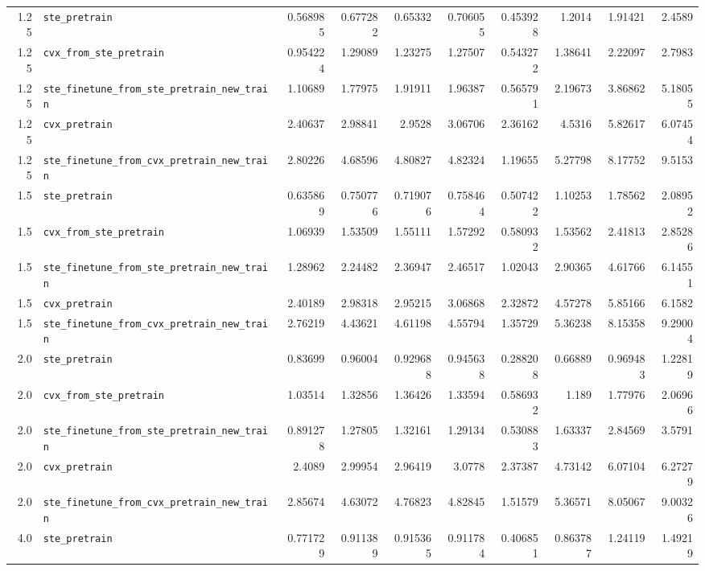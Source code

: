 \begin{longtable}{@{}r l *{8}{r}@{}}
1.25 & \texttt{ste\_pretrain} & 0.568985 & 0.677282 & 0.65332 & 0.706055 & 0.453928 & 1.2014 & 1.91421 & 2.4589 \\
1.25 & \texttt{cvx\_from\_ste\_pretrain} & 0.954224 & 1.29089 & 1.23275 & 1.27507 & 0.543272 & 1.38641 & 2.22097 & 2.7983 \\
1.25 & \texttt{ste\_finetune\_from\_ste\_pretrain\_new\_train} & 1.10689 & 1.77975 & 1.91911 & 1.96387 & 0.565791 & 2.19673 & 3.86862 & 5.18055 \\
1.25 & \texttt{cvx\_pretrain} & 2.40637 & 2.98841 & 2.9528 & 3.06706 & 2.36162 & 4.5316 & 5.82617 & 6.07454 \\
1.25 & \texttt{ste\_finetune\_from\_cvx\_pretrain\_new\_train} & 2.80226 & 4.68596 & 4.80827 & 4.82324 & 1.19655 & 5.27798 & 8.17752 & 9.5153 \\
1.5 & \texttt{ste\_pretrain} & 0.635869 & 0.750776 & 0.719076 & 0.758464 & 0.507422 & 1.10253 & 1.78562 & 2.08952 \\
1.5 & \texttt{cvx\_from\_ste\_pretrain} & 1.06939 & 1.53509 & 1.55111 & 1.57292 & 0.580932 & 1.53562 & 2.41813 & 2.85286 \\
1.5 & \texttt{ste\_finetune\_from\_ste\_pretrain\_new\_train} & 1.28962 & 2.24482 & 2.36947 & 2.46517 & 1.02043 & 2.90365 & 4.61766 & 6.14551 \\
1.5 & \texttt{cvx\_pretrain} & 2.40189 & 2.98318 & 2.95215 & 3.06868 & 2.32872 & 4.57278 & 5.85166 & 6.1582 \\
1.5 & \texttt{ste\_finetune\_from\_cvx\_pretrain\_new\_train} & 2.76219 & 4.43621 & 4.61198 & 4.55794 & 1.35729 & 5.36238 & 8.15358 & 9.29004 \\
2.0 & \texttt{ste\_pretrain} & 0.83699 & 0.96004 & 0.929688 & 0.945638 & 0.288208 & 0.66889 & 0.969483 & 1.22819 \\
2.0 & \texttt{cvx\_from\_ste\_pretrain} & 1.03514 & 1.32856 & 1.36426 & 1.33594 & 0.586932 & 1.189 & 1.77976 & 2.06966 \\
2.0 & \texttt{ste\_finetune\_from\_ste\_pretrain\_new\_train} & 0.891278 & 1.27805 & 1.32161 & 1.29134 & 0.530883 & 1.63337 & 2.84569 & 3.5791 \\
2.0 & \texttt{cvx\_pretrain} & 2.4089 & 2.99954 & 2.96419 & 3.0778 & 2.37387 & 4.73142 & 6.07104 & 6.27279 \\
2.0 & \texttt{ste\_finetune\_from\_cvx\_pretrain\_new\_train} & 2.85674 & 4.63072 & 4.76823 & 4.82845 & 1.51579 & 5.36571 & 8.05067 & 9.00326 \\
4.0 & \texttt{ste\_pretrain} & 0.771729 & 0.911389 & 0.915365 & 0.911784 & 0.406851 & 0.863787 & 1.24119 & 1.49219 \\

\end{longtable}
